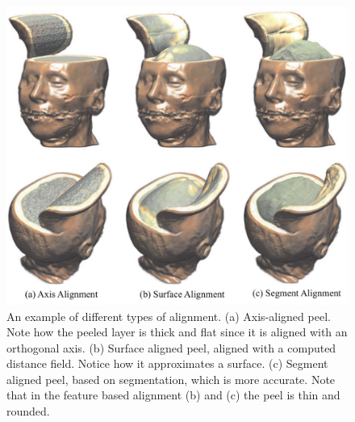 \begin{figure}
\centering
\includegraphics[width=\textwidth]{Figures/peel.pdf}
\decoRule
\caption[ Feature Aligned Volume Manipulation]{ An example of different types of alignment. (a) Axis-aligned peel. Note how the peeled layer is thick and flat since it is aligned with
an orthogonal axis. (b) Surface aligned peel, aligned with a computed
distance field. Notice how it approximates a surface. (c) Segment
aligned peel, based on segmentation, which is more accurate. Note
that in the feature based alignment (b) and (c) the peel is thin and
rounded.}
\label{fig:peel}
\end{figure}

